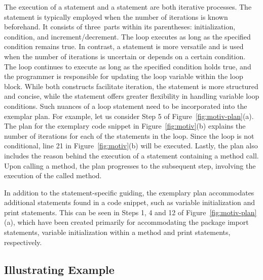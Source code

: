The execution of a  statement and a  statement are both iterative processes.
The  statement is typically employed when the number of iterations is known beforehand. It consists of three~parts within its parentheses: initialization, condition, and increment/decrement. The loop executes as long as the specified condition remains true. In contrast, a  statement is more versatile and is used when the number of iterations is uncertain or depends on a certain condition. The  loop continues to execute as long as the specified condition holds true, and the programmer is responsible for updating the loop variable within the loop block. While both constructs facilitate iteration, the  statement is more structured and concise, while the  statement offers greater flexibility in handling variable loop conditions. Such nuances of a loop statement need to be incorporated into the exemplar plan. For example, let us consider Step 5 of Figure~\ref{fig:motiv-plan}(a). The plan for the exemplary code snippet in Figure~\ref{fig:motiv}(b) explains the number of iterations for each of the statements in the  loop. Since the  loop is not conditional, line 21 in Figure~\ref{fig:motiv}(b) will be executed.
%
Lastly, the plan also includes the reason behind the execution of a statement containing a method call. Upon calling a method, the plan progresses to the subsequent step, involving the execution of the called method.

In addition to the statement-specific guiding, the exemplary plan accommodates additional statements found in a code snippet, such as variable initialization and print statements. This can be seen in Steps 1, 4 and 12 of Figure~\ref{fig:motiv-plan}(a), which have been created primarily for accommodating the package import statements, variable initialization within a method and print statements, respectively.


\subsection{Illustrating Example}\label{sec:one-prompt-ex}

